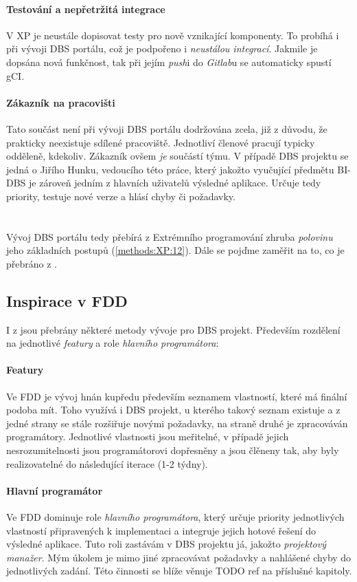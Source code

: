 \paragraph{Testování a nepřetržitá integrace}
V XP je  neustále dopisovat testy pro nově vznikající komponenty. To probíhá i při vývoji DBS portálu, což je podpořeno i \emph{neustálou integrací}. Jakmile je dopsána nová funkčnost, tak při jejím \emph{push}i do \emph{Gitlab}u se automaticky spustí \gls{gCI}.

\paragraph{Zákazník na pracovišti}
Tato součást není při vývoji DBS portálu dodržována zcela, již z důvodu, že prakticky neexistuje sdílené pracoviště. Jednotliví členové pracují typicky odděleně, kdekoliv.
Zákazník ovšem \emph{je} součástí týmu. V případě DBS projektu se jedná o Jiřího Hunku, vedoucího této práce, který jakožto vyučující předmětu BI-DBS je zároveň jedním z hlavních uživatelů výsledné aplikace. Určuje tedy priority, testuje nové verze a hlásí chyby či požadavky.
\\
\\
\\
Vývoj DBS portálu tedy přebírá z Extrémního programování zhruba \emph{polovinu} jeho základních postupů (\ref{methods:XP:12}). Dále se pojďme zaměřit na to, co je přebráno z .


\subsection{Inspirace v FDD}

I z  jsou přebrány některé metody vývoje pro DBS projekt. Především rozdělení na jednotlivé \emph{featury} a role \emph{hlavního programátora}:

\paragraph{Featury} Ve FDD je vývoj hnán kupředu především seznamem vlastností, které má finální podoba mít. Toho využívá i DBS projekt, u kterého takový seznam existuje a z jedné strany se stále rozšiřuje novými požadavky, na straně druhé je zpracováván programátory. Jednotlivé vlastnosti jsou meřitelné, v případě jejich nesrozumitelnosti jsou programátorovi dopřesněny a jsou člěneny tak, aby byly realizovatelné do následující iterace (1-2 týdny).

\paragraph{Hlavní programátor}
Ve FDD dominuje role \emph{hlavního programátora}, který určuje priority jednotlivých vlastností připravených k implementaci a integruje jejich hotové řešení do výsledné aplikace. Tuto roli zastávám v DBS projektu já, jakožto \emph{projektový manažer}. Mým úkolem je mimo jiné zpracovávat požadavky a nahlášené chyby do jednotlivých zadání. Této činnosti se blíže věnuje TODO ref na příslušné kapitoly.
